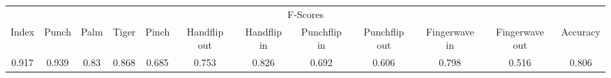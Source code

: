 \documentclass{standalone}
\begin{document}
 
 \begin{tabular}{|c|c|c|c|c|c|c|c|c|c|c ||c|}
\cline{1-12}\multicolumn{12}{|c|}{F-Scores} \\ 
\cline{1-12}Index & Punch & Palm & Tiger & Pinch & Handflip out & Handflip in & Punchflip in & Punchflip out & Fingerwave in & Fingerwave out & Accuracy\\ 
\cline{1-12}0.917 & 0.939 & 0.83 & 0.868 & 0.685 & 0.753 & 0.826 & 0.692 & 0.606 & 0.798 & 0.516 & 0.806\\ 
 \cline{1-12}\hline \end{tabular}
 
\end{document}
